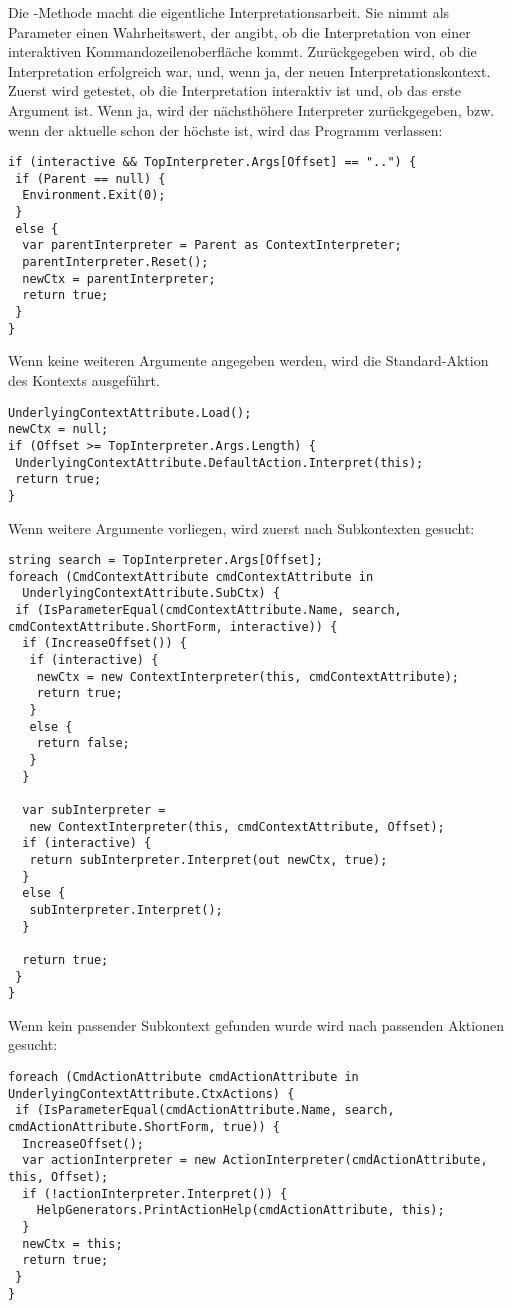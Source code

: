 Die -Methode macht die eigentliche Interpretationsarbeit.
Sie nimmt als Parameter einen Wahrheitswert, der angibt, ob die Interpretation von einer interaktiven Kommandozeilenoberfläche kommt.
Zurückgegeben wird, ob die Interpretation erfolgreich war, und, wenn ja, der neuen Interpretationskontext.
Zuerst wird getestet, ob die Interpretation interaktiv ist und, ob das erste Argument  ist.
Wenn ja, wird der  nächsthöhere Interpreter zurückgegeben, bzw. wenn der aktuelle schon der höchste ist, wird das Programm verlassen:
\begin{lstlisting}[title=""]
if (interactive && TopInterpreter.Args[Offset] == "..") {
 if (Parent == null) {
  Environment.Exit(0);
 }
 else {
  var parentInterpreter = Parent as ContextInterpreter;
  parentInterpreter.Reset();
  newCtx = parentInterpreter;
  return true;
 }
}
\end{lstlisting}
Wenn keine weiteren Argumente angegeben werden, wird die Standard-Aktion des Kontexts ausgeführt.
\begin{lstlisting}[title=""]
UnderlyingContextAttribute.Load();
newCtx = null;
if (Offset >= TopInterpreter.Args.Length) {
 UnderlyingContextAttribute.DefaultAction.Interpret(this);
 return true;
}
\end{lstlisting}
Wenn weitere Argumente vorliegen, wird zuerst nach Subkontexten gesucht:
\begin{lstlisting}[title=""]
string search = TopInterpreter.Args[Offset];
foreach (CmdContextAttribute cmdContextAttribute in 
  UnderlyingContextAttribute.SubCtx) {
 if (IsParameterEqual(cmdContextAttribute.Name, search, cmdContextAttribute.ShortForm, interactive)) {
  if (IncreaseOffset()) {
   if (interactive) {
    newCtx = new ContextInterpreter(this, cmdContextAttribute);
    return true;
   }
   else {
    return false;
   }
  }

  var subInterpreter = 
   new ContextInterpreter(this, cmdContextAttribute, Offset);
  if (interactive) {
   return subInterpreter.Interpret(out newCtx, true);
  }
  else {
   subInterpreter.Interpret();
  }

  return true;
 }
}
\end{lstlisting}
Wenn kein passender Subkontext gefunden wurde wird nach passenden Aktionen gesucht:
\begin{lstlisting}[title=""]
foreach (CmdActionAttribute cmdActionAttribute in UnderlyingContextAttribute.CtxActions) {
 if (IsParameterEqual(cmdActionAttribute.Name, search, cmdActionAttribute.ShortForm, true)) {
  IncreaseOffset();
  var actionInterpreter = new ActionInterpreter(cmdActionAttribute, this, Offset);
  if (!actionInterpreter.Interpret()) {
  	HelpGenerators.PrintActionHelp(cmdActionAttribute, this);
  }
  newCtx = this;
  return true;
 }
}
\end{lstlisting}
